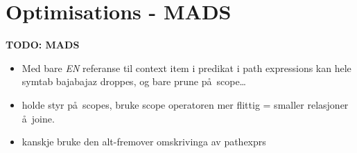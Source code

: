\section{Optimisations - {MADS}}
\label{sect:disc:optimisations}
\textbf{\LARGE TODO: {MADS}}
\begin{itemize}
  \item Med bare \emph{EN} referanse til context item i predikat i path expressions kan hele symtab bajabajaz
  droppes, og bare prune p\aa~scope\ldots
  \item holde styr p\aa~scopes, bruke scope operatoren mer flittig = smaller relasjoner \aa~joine.
  \item kanskje bruke den alt-fremover omskrivinga av pathexprs
\end{itemize}